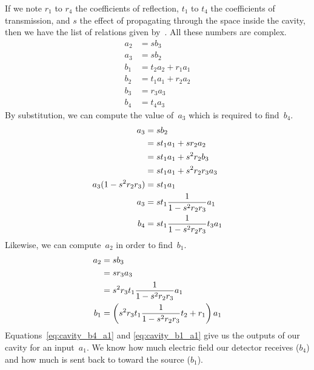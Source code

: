 If we note $r_1$ to $r_4$ the coefficients of reflection,
$t_1$ to $t_4$ the coefficients of transmission,
and $s$ the effect of propagating through the space inside the cavity,
then we have the list of relations given by~.
All these numbers are complex.
\begin{align}
    a_2 &= s b_3             \label{eq:cavity_rel_a2} \\
    a_3 &= s b_2             \label{eq:cavity_rel_a3} \\
    b_1 &= t_2 a_2 + r_1 a_1 \label{eq:cavity_rel_b1} \\
    b_2 &= t_1 a_1 + r_2 a_2 \label{eq:cavity_rel_b2} \\
    b_3 &= r_3 a_3           \label{eq:cavity_rel_b3} \\
    b_4 &= t_4 a_3           \label{eq:cavity_rel_b4}
\end{align}
By substitution, we can compute the value of~$a_3$ which is required to find~$b_4$.
\begin{align}
    a_3 &= s b_2                               \notag \\
        &= s t_1 a_1 + s r_2 a_2               \notag \\
        &= s t_1 a_1 + s^2 r_2 b_3             \notag \\
        &= s t_1 a_1 + s^2 r_2 r_3 a_3         \notag \\
    a_3 (1 - s^2 r_2 r_3) &= s t_1 a_1         \notag \\
    a_3 &= s t_1 \frac{1}{1 - s^2 r_2 r_3} a_1 \notag \\
    b_4 &= s t_1 \frac{1}{1 - s^2 r_2 r_3} t_3 a_1 \label{eq:cavity_b4_a1}
\end{align}
Likewise, we can compute~$a_2$ in order to find~$b_1$.
\begin{align}
    a_2 &= s b_3                                     \notag \\
        &= s r_3 a_3                                 \notag \\
        &= s^2 r_3 t_1 \frac{1}{1 - s^2 r_2 r_3} a_1 \notag \\
    b_1 &= \left(s^2 r_3 t_1 \frac{1}{1 - s^2 r_2 r_3} t_2 + r_1 \right) a_1 \label{eq:cavity_b1_a1}
\end{align}
Equations~\eqref{eq:cavity_b4_a1} and \eqref{eq:cavity_b1_a1} give us the outputs of our cavity for an input~$a_1$.
We know how much electric field our detector receives ($b_4$) and how much is sent back to toward the source ($b_1$).

